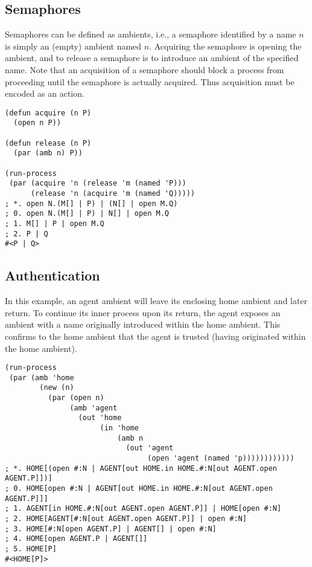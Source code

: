 \documentclass[12pt]{article}
\begin{document}
\subsection{Semaphores}
\label{sec:semaphores}

Semaphores can be defined as ambients, i.e., a semaphore identified by a name $n$ is simply an (empty) ambient named $n$.
Acquiring the semaphore is opening the ambient, and to release a semaphore is to introduce an ambient of the specified name.
Note that an acquisition of a semaphore should block a process from proceeding until the semaphore is actually acquired.
Thus acquisition must be encoded as an action.

\begin{verbatim}
(defun acquire (n P)
  (open n P))

(defun release (n P)
  (par (amb n) P))

(run-process
 (par (acquire 'n (release 'm (named 'P)))
      (release 'n (acquire 'm (named 'Q)))))
; *. open N.(M[] | P) | (N[] | open M.Q)
; 0. open N.(M[] | P) | N[] | open M.Q
; 1. M[] | P | open M.Q
; 2. P | Q
#<P | Q>
\end{verbatim}

\subsection{Authentication}
\label{sec:authentication}

In this example, an agent ambient will leave its enclosing home ambient and later return.
To continue its inner process upon its return, the agent exposes an ambient with a name originally introduced within the home ambient.
This confirms to the home ambient that the agent is trusted (having originated within the home ambient).

\begin{verbatim}
(run-process 
 (par (amb 'home
        (new (n)
          (par (open n)
               (amb 'agent
                 (out 'home
                      (in 'home
                          (amb n
                            (out 'agent
                                 (open 'agent (named 'p))))))))))))
; *. HOME[(open #:N | AGENT[out HOME.in HOME.#:N[out AGENT.open AGENT.P]])]
; 0. HOME[open #:N | AGENT[out HOME.in HOME.#:N[out AGENT.open AGENT.P]]]
; 1. AGENT[in HOME.#:N[out AGENT.open AGENT.P]] | HOME[open #:N]
; 2. HOME[AGENT[#:N[out AGENT.open AGENT.P]] | open #:N]
; 3. HOME[#:N[open AGENT.P] | AGENT[] | open #:N]
; 4. HOME[open AGENT.P | AGENT[]]
; 5. HOME[P]
#<HOME[P]>
\end{verbatim}
\end{document}
